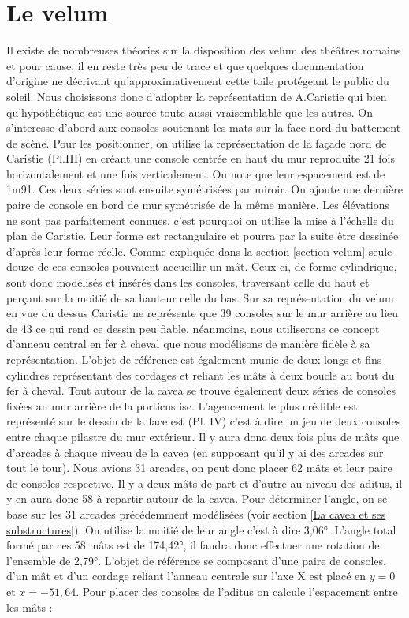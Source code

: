 \section{Le velum} \label{sect_velum}
Il existe de nombreuses théories sur la disposition des velum des théâtres romains et pour cause, il en reste très peu de trace et que quelques documentation d'origine ne décrivant qu'approximativement cette toile protégeant le public du soleil. Nous choisissons donc d'adopter la représentation de A.Caristie \cite[Pl. VI]{orangePl} qui bien qu'hypothétique est une source toute aussi vraisemblable que les autres. On s'interesse d'abord aux consoles soutenant les mats sur la face nord du battement de scène. Pour les positionner, on utilise la représentation de la façade nord de Caristie (Pl.III) en créant une console centrée en haut du mur reproduite 21 fois horizontalement et une fois verticalement. On note que leur espacement est de 1m91. Ces deux séries sont ensuite symétrisées par miroir. On ajoute une dernière paire de console en bord de mur symétrisée de la même manière. Les élévations ne sont pas parfaitement connues, c'est pourquoi on utilise la mise à l'échelle du plan de Caristie. Leur forme est rectangulaire et pourra par la suite être dessinée d'après leur forme réelle. Comme expliquée dans la section \ref{section velum} seule douze de ces consoles pouvaient accueillir un mât. Ceux-ci, de forme cylindrique, sont donc modélisés et insérés dans les consoles, traversant celle du haut et perçant sur la moitié de sa hauteur celle du bas.
Sur sa représentation du velum en vue du dessus Caristie ne représente que 39 consoles sur le mur arrière au lieu de 43 ce qui rend ce dessin peu fiable, néanmoins, nous utiliserons ce concept d'anneau central en fer à cheval que nous modélisons de manière fidèle à sa représentation. L'objet de référence est également munie de deux longs et fins cylindres représentant des cordages et reliant les mâts à deux boucle au bout du fer à cheval.
Tout autour de la cavea se trouve également deux séries de consoles fixées au mur arrière de la \gls{porticus isc}. L'agencement le plus crédible est représenté sur le dessin de la face est (Pl. IV) c'est à dire un jeu de deux consoles entre chaque \gls{pilastre} du mur extérieur. Il y aura donc deux fois plus de mâts que d'arcades à chaque niveau de la cavea (en supposant qu'il y ai des arcades sur tout le tour). Nous avions 31 arcades, on peut donc placer 62 mâts et leur paire de consoles respective. Il y a deux mâts de part et d'autre au niveau des aditus, il y en aura donc 58 à repartir autour de la cavea. Pour déterminer l'angle, on se base sur les 31 arcades précédemment modélisées (voir section \ref{La cavea et ses substructures}). On utilise la moitié de leur angle c'est à dire 3,06°. L'angle total formé par ces 58 mâts est de 174,42°, il faudra donc effectuer une rotation de l'ensemble de 2,79°. L'objet de référence se composant d'une paire de consoles, d'un mât et d'un cordage reliant l'anneau centrale sur l'axe X est placé en $y=0$ et $x=-51,64$. Pour placer des consoles de l'aditus on calcule l'espacement entre les mâts :

